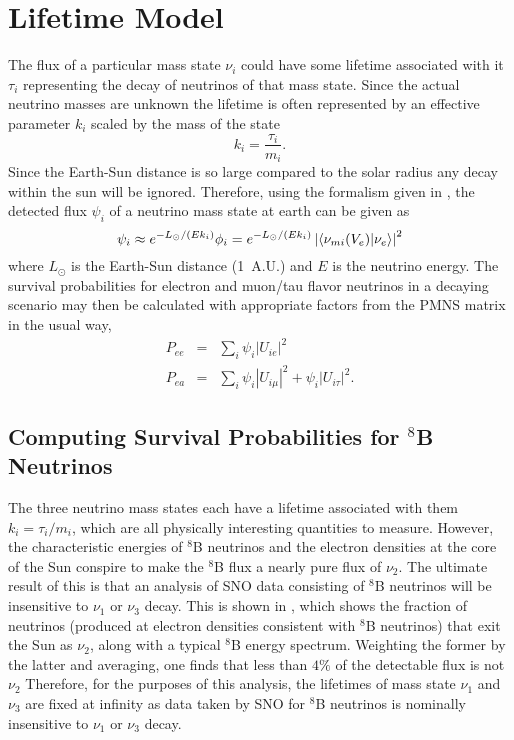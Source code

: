 \section{Lifetime Model}
\label{lifetime_model}

The flux of a particular mass state $\nu_i$ could have some lifetime associated with it $\tau_i$ representing the decay of neutrinos of that mass state.
Since the actual neutrino masses are unknown the lifetime is often represented by an effective parameter $k_i$ scaled by the mass of the state
\begin{equation}
k_i = \frac{\tau_i}{m_i}.
\end{equation}
Since the Earth-Sun distance is so large compared to the solar radius any decay within the sun will be ignored. 
Therefore, using the formalism given in , the detected flux $\psi_i$ of a neutrino mass state at earth can be given as 
\begin{equation}
\psi_i \approx  e^{-L_\odot / (E k_i)} \phi_i =  e^{-L_\odot / (E k_i)} \left| \braket{\nu_{m i}(V_e)}{\nu_e} \right|^2
\label{decay}
\end{equation}
where $L_\odot$ is the Earth-Sun distance (1~A.U.) and $E$ is the neutrino energy.
The survival probabilities for electron and muon/tau flavor neutrinos in a decaying scenario may then be calculated with appropriate factors from the PMNS matrix in the usual way,
\begin{equation}
\begin{array}{rcl}
P_{ee} & = & \sum_i \psi_i |U_{ie}|^2  \\
P_{ea} & = & \sum_i \psi_i |U_{i\mu}|^2 + \psi_i |U_{i\tau}|^2.
\end{array}
\label{survive}
\end{equation}

\subsection{Computing Survival Probabilities for $^8$B Neutrinos}

\label{montecarlo}

The three neutrino mass states each have a lifetime associated with them $k_i = \tau_i / m_i$, which are all physically interesting quantities to measure.
However, the characteristic energies of $^8$B neutrinos and the electron densities at the core of the Sun conspire to make the $^8$B flux a nearly pure flux of $\nu_2$.
The ultimate result of this is that an analysis of SNO data consisting of $^8$B neutrinos will be insensitive to $\nu_1$ or $\nu_3$ decay.
This is shown in , which shows the fraction of neutrinos (produced at electron densities consistent with $^8$B neutrinos) that exit the Sun as $\nu_2$, along with a typical $^8$B energy spectrum.
Weighting the former by the latter and averaging, one finds that less than $4\%$ of the detectable flux is not $\nu_2$
Therefore, for the purposes of this analysis, the lifetimes of mass state $\nu_1$ and $\nu_3$ are fixed at infinity as data taken by SNO for $^8$B neutrinos is nominally insensitive to $\nu_1$ or $\nu_3$ decay.

